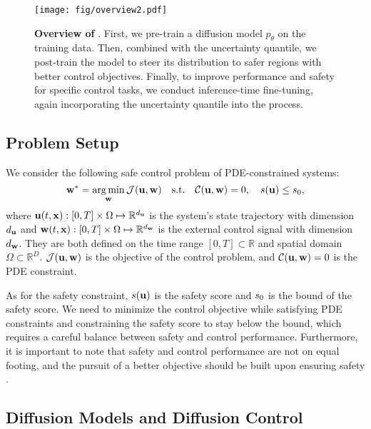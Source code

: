 \begin{figure*}[t]
\begin{center}
    \texttt{[image: fig/overview2.pdf]}
\end{center}
\vspace{-10pt}
\caption{\textbf{Overview of \proj}. First, we pre-train a diffusion model $p_{\theta}$ on the training data. Then, combined with the uncertainty quantile, we post-train the model to steer its distribution to safer regions with better control objectives. Finally, to improve performance and safety for specific control tasks, we conduct inference-time fine-tuning, again incorporating the uncertainty quantile into the process.}
\vspace{-10pt}
\label{fig:overview}
\end{figure*}

\subsection{Problem Setup}
We consider the following safe control problem of PDE-constrained systems:
\begin{equation}
    \mathbf{w}^*=\operatorname*{arg\,min}_{\mathbf{w}}\mathcal{J}(\mathbf{u},\mathbf{w})\quad\text{s.t.}\quad\mathcal{C}(\mathbf{u},\mathbf{w})=0,\quad s(\mathbf{u})\leq s_0,
    \label{eq:origion_optimization}
\end{equation}
where $\mathbf{u}(t,\mathbf{x}):[0,T]\times \Omega\mapsto \mathbb{R}^{d_{\mathbf{u}}}$ is the system's state trajectory with dimension ${d_{\mathbf{u}}}$ and $\mathbf{w}(t,\mathbf{x}):[0,T]\times \Omega\mapsto \mathbb{R}^{d_{\mathbf{w}}}$ is the external control signal with dimension ${d_{\mathbf{w}}}$. They are both defined on the time range $[0,T]\subset\mathbb{R}$ and spatial domain $\Omega\subset \mathbb{R}^{D}$. 
$\mathcal{J}(\mathbf{u},\mathbf{w})$ is the objective of the control problem, and $\mathcal{C}(\mathbf{u},\mathbf{w})=0$ is the PDE constraint.

As for the safety constraint, $s(\mathbf{u})$ is the safety score and $s_0$ is the bound of the safety score. 
We need to minimize the control objective while satisfying PDE constraints and constraining the safety score to stay below the bound, which requires a careful balance between safety and control performance. Furthermore, it is important to note that safety and control performance are not on equal footing, and the pursuit of a better objective should be built upon ensuring safety \cite{knight2002safety, cheng2019end}.

\subsection{Diffusion Models and Diffusion Control}
\label{sec:ddpm}

